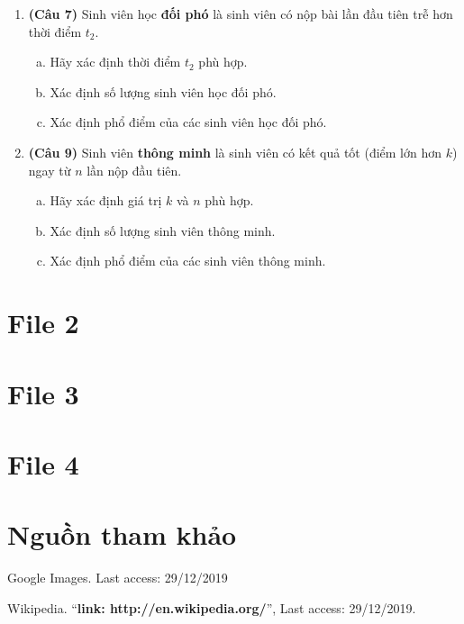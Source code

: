 \documentclass[12pt,a4paper]{article}  %
\begin{document}
\begin{enumerate}
    
\item {\textbf{(Câu 7)} Sinh viên học \textbf{đối phó} là sinh viên có nộp bài lần đầu tiên trễ hơn thời điểm $t_2$.} 
\begin{enumerate}[a)]
    \item {Hãy xác định thời điểm $t_2$ phù hợp.}
    \item {Xác định số lượng sinh viên học đối phó.}
    \item {Xác định phổ điểm của các sinh viên học đối phó.}
\end{enumerate}
    

    
\item {\textbf{(Câu 9)} Sinh viên \textbf{thông minh} là sinh viên  có kết quả tốt (điểm lớn hơn $k$) ngay từ $n$ lần nộp đầu tiên.}
\begin{enumerate}[a)]
    \item {Hãy xác định giá trị $k$ và $n$ phù hợp.} 
    \item {Xác định số lượng sinh viên thông minh.}
    \item {Xác định phổ điểm của các sinh viên thông minh.}
\end{enumerate}    
    
\end{enumerate}

\newpage

\section{File 2}
\newpage


\section{File 3}
\newpage


\section{File 4}
\newpage
\section{Nguồn tham khảo}
\begin{thebibliography}{80}


	 Google Images. Last access: 29/12/2019


	 Wikipedia.
	``\textbf{link: http://en.wikipedia.org/}'',
	Last access: 29/12/2019.
	
	
	
\end{thebibliography}	
\end{document}
